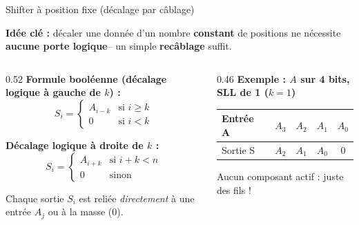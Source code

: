 \begin{frame}{Shifter à position fixe (décalage par câblage)}

    \textbf{Idée clé :} décaler une donnée d'un nombre \textbf{constant}
    de positions ne nécessite \textbf{aucune porte logique}--
    un simple \textbf{recâblage} suffit.

    \vspace{0.3cm}

    \begin{columns}
        \begin{column}{0.52\textwidth}
            \textbf{Formule booléenne (décalage logique à gauche de $k$) :}
            $$S_i = \begin{cases} A_{i-k} & \text{si } i \geq k \\[2pt] 0 & \text{si } i < k \end{cases}$$

            \vspace{0.3cm}

            \textbf{Décalage logique à droite de $k$ :}
            $$S_i = \begin{cases} A_{i+k} & \text{si } i+k < n \\[2pt] 0 & \text{sinon} \end{cases}$$

            \vspace{0.3cm}

            \footnotesize Chaque sortie $S_i$ est reliée \emph{directement}
            à une entrée $A_j$ ou à la masse (0).
        \end{column}

        \begin{column}{0.46\textwidth}
            \textbf{Exemple : $A$ sur 4 bits, SLL de 1 ($k=1$)}

            \vspace{0.3cm}

            \begin{center}
            \footnotesize
            \begin{tabular}{l|cccc}
                \toprule
                Entrée A & $A_3$ & $A_2$ & $A_1$ & $A_0$\\
                \midrule
                Sortie S & $A_2$ & $A_1$ & $A_0$ & $0$ \\
                \bottomrule
            \end{tabular}
            \end{center}

            \vspace{0.3cm}

            \footnotesize Aucun composant actif : juste des fils !
        \end{column}
    \end{columns}

\end{frame}


